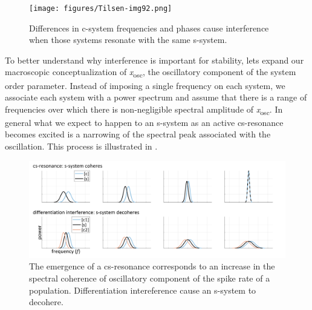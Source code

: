   
\begin{figure}
\texttt{[image: figures/Tilsen-img92.png]}
\caption{Differences in c-system frequencies and phases cause interference when those systems resonate with the same s-system.}
\label{fig:4:42}
\end{figure}
 

  To better understand why interference is important for stability, lets expand our macroscopic conceptualization of \textit{x}\textsubscript{osc}, the oscillatory component of the system order parameter. Instead of imposing a single frequency on each system, we associate each system with a power spectrum and assume that there is a range of frequencies over which there is non-negligible spectral amplitude of \textit{x}\textsubscript{osc}. In general what we expect to happen to an s-system as an active cs-resonance becomes excited is a narrowing of the spectral peak associated with the oscillation. This process is illustrated in {}.

  
\begin{figure}
\includegraphics[width=\textwidth]{figures/Tilsen-img93.png}
\caption{The emergence of a cs-resonance corresponds to an increase in the spectral coherence of oscillatory component of the spike rate of a population. Differentiation intereference cause an s-system to decohere.}
\label{fig:4:43}
\end{figure}
 

